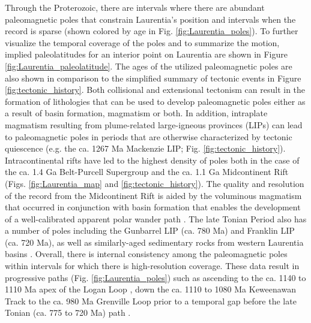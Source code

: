 \documentclass[twocolumn, switch]{article} %
\begin{document}
Through the Proterozoic, there are intervals where there are abundant paleomagnetic poles that constrain Laurentia's position and intervals when the record is sparse (shown colored by age in Fig. \ref{fig:Laurentia_poles}). To further visualize the temporal coverage of the poles and to summarize the motion, implied paleolatitudes for an interior point on Laurentia are shown in Figure \ref{fig:Laurentia_paleolatitude}. The ages of the utilized paleomagnetic poles are also shown in comparison to the simplified summary of tectonic events in Figure \ref{fig:tectonic_history}. Both collisional and extensional tectonism can result in the formation of lithologies that can be used to develop paleomagnetic poles either as a result of basin formation, magmatism or both. In addition, intraplate magmatism resulting from plume-related large-igneous provinces (LIPs) can lead to paleomagnetic poles in periods that are otherwise characterized by tectonic quiescence (e.g. the ca. 1267 Ma Mackenzie LIP; Fig. \ref{fig:tectonic_history}). Intracontinental rifts have led to the highest density of poles both in the case of the ca. 1.4 Ga Belt-Purcell Supergroup and the ca. 1.1 Ga Midcontinent Rift (Figs. \ref{fig:Laurentia_map} and \ref{fig:tectonic_history}). The quality and resolution of the record from the Midcontinent Rift is aided by the voluminous magmatism that occurred in conjunction with basin formation that enables the development of a well-calibrated apparent polar wander path \citep{Swanson-Hysell2019a}. The late Tonian Period also has a number of poles including the Gunbarrel LIP (ca. 780 Ma) and Franklin LIP (ca. 720 Ma), as well as similarly-aged sedimentary rocks from western Laurentia basins \citep{Eyster2020a}. Overall, there is internal consistency among the paleomagnetic poles within intervals for which there is high-resolution coverage. These data result in progressive paths (Fig. \ref{fig:Laurentia_poles}) such as ascending to the ca. 1140 to 1110 Ma apex of the Logan Loop \citep{Robertson1971a}, down the ca. 1110 to 1080 Ma Keweenawan Track \citep{Swanson-Hysell2019a} to the ca. 980 Ma Grenville Loop \citep{McWilliams1975a} prior to a temporal gap before the late Tonian (ca. 775 to 720 Ma) path \citep{Eyster2020a}.
\end{document}
